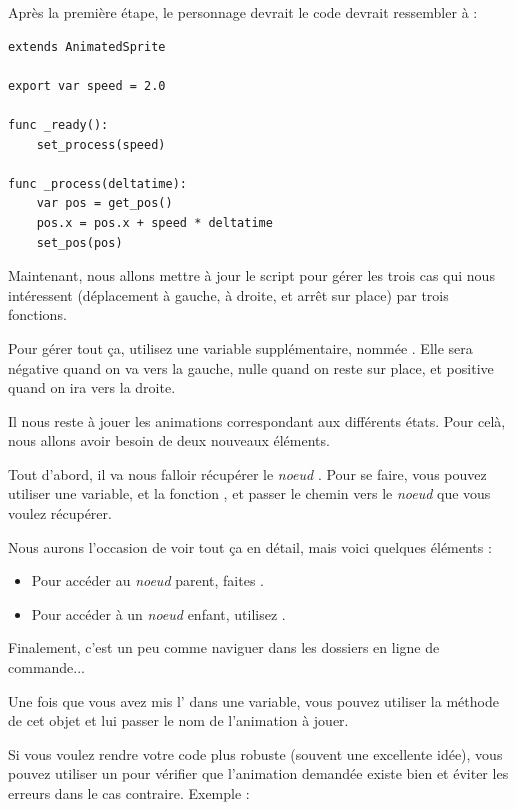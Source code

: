 Après la première étape, le personnage devrait le code devrait ressembler à :

\begin{lstlisting}
extends AnimatedSprite

export var speed = 2.0

func _ready():
    set_process(speed)

func _process(deltatime):
    var pos = get_pos()
    pos.x = pos.x + speed * deltatime
    set_pos(pos)
\end{lstlisting}

Maintenant, nous allons mettre à jour le script pour gérer les trois cas qui nous intéressent (déplacement à gauche, à droite, et arrêt sur place) par trois fonctions.

Pour gérer tout ça, utilisez une variable supplémentaire, nommée . Elle sera négative quand on va vers la gauche, nulle quand on reste sur place, et positive quand on ira vers la droite.

Il nous reste à jouer les animations correspondant aux différents états. Pour celà, nous allons avoir besoin de deux nouveaux éléments.

Tout d'abord, il va nous falloir récupérer le \emph{noeud} . Pour se faire, vous pouvez utiliser une variable, et la fonction , et passer le chemin vers le \emph{noeud} que vous voulez récupérer.

Nous aurons l'occasion de voir tout ça en détail, mais voici quelques éléments :

\begin{itemize}
\item Pour accéder au \emph{noeud} parent, faites .
\item Pour accéder à un \emph{noeud} enfant, utilisez .
\end{itemize}

Finalement, c'est un peu comme naviguer dans les dossiers en ligne de commande...

Une fois que vous avez mis l' dans une variable, vous pouvez utiliser la méthode  de cet objet et lui passer le nom de l'animation à jouer.

Si vous voulez rendre votre code plus robuste (souvent une excellente idée), vous pouvez utiliser un  pour vérifier que l'animation demandée existe bien et éviter les erreurs dans le cas contraire. Exemple :

